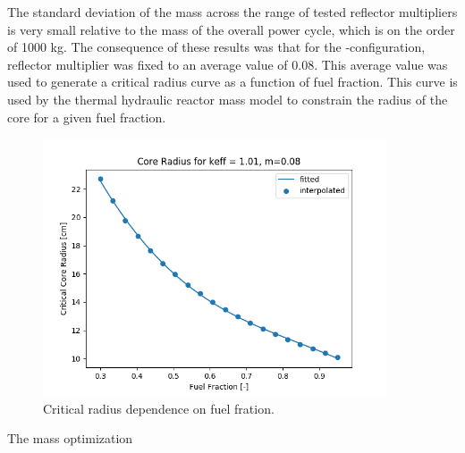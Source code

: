 The standard deviation of the mass across the range of tested reflector
multipliers is very small relative to the mass of the overall power cycle,
which is on the order of 1000 kg. The consequence of these results was that for the \uox-\codiox configuration, reflector multiplier was fixed to an
average value of 0.08. This average value was used to generate a critical radius
curve as a function of fuel fraction. This curve is used by the thermal
hydraulic reactor mass model to constrain the radius of the core for a given
fuel fraction. 

\begin{figure}[h]
    \centering
    \includegraphics[width=4in]{../images/uo2_co2_core_r.png}
\caption{Critical radius dependence on fuel fration.}
\label{fig:core_r_co2_uo2}
\end{figure}

The mass optimization 
